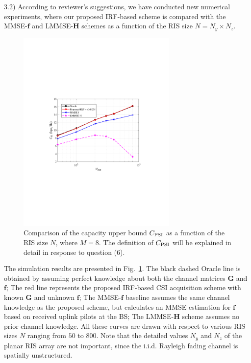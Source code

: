 \documentclass[a4paper,12pt]{article}
\begin{document}
{{3.2) According to reviewer's suggestions, we have conducted new numerical experiments, where our proposed IRF-based scheme is compared with the MMSE-$\bm f$ and LMMSE-$\bm H$ schemes as a function of the RIS size $N=N_y\times N_z$. 
\begin{figure}[h]
    \centering 
    \includegraphics[width=0.7\textwidth]{figs/C-wrt-N_RIS.pdf}
    \caption{Comparison of the capacity upper bound $C_{\rm PSI}$ as a function of the RIS size $N$, where $M=8$. The definition of $C_{\rm PSI}$ will be explained in detail in response to question (6). }
    \label{fig:RIS_size}
\end{figure}

The simulation results are presented in {Fig.~\ref{fig:RIS_size}}. The black dashed Oracle line is obtained by assuming perfect knowledge about both the channel matrices $\bm G$ and $\bm f$; The red line represents the proposed IRF-based CSI acquisition scheme with known $\bm G$ and unknown $\bm f$; The MMSE-$\bm f$ baseline assumes the same channel knowledge as the proposed scheme, but calculates an MMSE estimation for $\bm f$ based on received uplink pilots at the BS; The LMMSE-$\bm H$ scheme assumes no prior channel knowledge. All these curves are drawn with respect to various RIS sizes $N$ ranging from $50$ to $800$. Note that the detailed values $N_y$ and $N_z$ of the planar RIS array are not important, since the i.i.d. Rayleigh fading channel is spatially unstructured.  

}}
\end{document}
